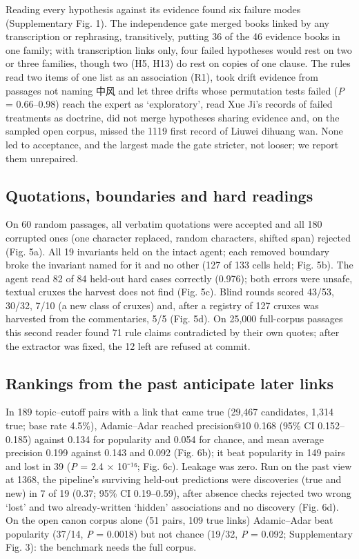 \documentclass[
]{article}
\begin{document}
Reading every hypothesis against its evidence found six failure modes
(Supplementary Fig. 1). The independence gate merged books linked by any
transcription or rephrasing, transitively, putting 36 of the 46 evidence
books in one family; with transcription links only, four failed
hypotheses would rest on two or three families, though two (H5, H13) do
rest on copies of one clause. The rules read two items of one list as an
association (R1), took drift evidence from passages not naming 中风 and
let three drifts whose permutation tests failed (\emph{P} = 0.66--0.98)
reach the expert as `exploratory', read Xue Ji's records of failed
treatments as doctrine, did not merge hypotheses sharing evidence and,
on the sampled open corpus, missed the 1119 first record of Liuwei
dihuang wan. None led to acceptance, and the largest made the gate
stricter, not looser; we report them unrepaired.

\hypertarget{quotations-boundaries-and-hard-readings}{%
\subsection{Quotations, boundaries and hard
readings}\label{quotations-boundaries-and-hard-readings}}

On 60 random passages, all verbatim quotations were accepted and all 180
corrupted ones (one character replaced, random characters, shifted span)
rejected (Fig. 5a). All 19 invariants held on the intact agent; each
removed boundary broke the invariant named for it and no other (127 of
133 cells held; Fig. 5b). The agent read 82 of 84 held-out hard cases
correctly (0.976); both errors were unsafe, textual cruxes the harvest
does not find (Fig. 5c). Blind rounds scored 43/53, 30/32, 7/10 (a new
class of cruxes) and, after a registry of 127 cruxes was harvested from
the commentaries, 5/5 (Fig. 5d). On 25,000 full-corpus passages this
second reader found 71 rule claims contradicted by their own quotes;
after the extractor was fixed, the 12 left are refused at commit.

\hypertarget{rankings-from-the-past-anticipate-later-links}{%
\subsection{Rankings from the past anticipate later
links}\label{rankings-from-the-past-anticipate-later-links}}

In 189 topic--cutoff pairs with a link that came true (29,467
candidates, 1,314 true; base rate 4.5\%), Adamic--Adar reached
precision@10 0.168 (95\% CI 0.152--0.185) against 0.134 for popularity
and 0.054 for chance, and mean average precision 0.199 against 0.143 and
0.092 (Fig. 6b); it beat popularity in 149 pairs and lost in 39
(\emph{P} = 2.4 × 10⁻¹⁶; Fig. 6c). Leakage was zero. Run on the past
view at 1368, the pipeline's surviving held-out predictions were
discoveries (true and new) in 7 of 19 (0.37; 95\% CI 0.19--0.59), after
absence checks rejected two wrong `lost' and two already-written
`hidden' associations and no discovery (Fig. 6d). On the open canon
corpus alone (51 pairs, 109 true links) Adamic--Adar beat popularity
(37/14, \emph{P} = 0.0018) but not chance (19/32, \emph{P} = 0.092;
Supplementary Fig. 3): the benchmark needs the full corpus.
\end{document}
